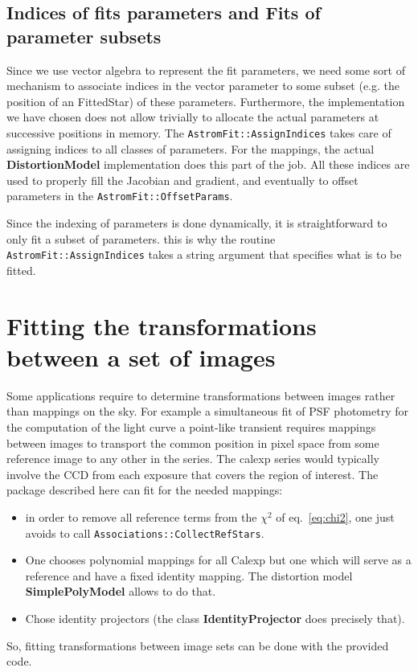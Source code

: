 \documentclass[a4paper,12pt]{scrartcl}
\newcommand{\ClName}[1]{{\bf #1}}
\newcommand{\RoutineName}[1]{\texttt{#1}}
\def\bf{\normalfont\bfseries}
\begin{document}
\subsection{Indices of fits parameters and Fits of parameter subsets \label{sec:indices_whattofit}}
Since we use vector algebra to represent the fit parameters, we need
some sort of mechanism to associate indices in the vector parameter to
some subset (e.g. the position of an FittedStar) of these parameters.
Furthermore, the implementation we have chosen does not allow
trivially to allocate the actual parameters at successive positions in
memory. The \RoutineName{AstromFit::AssignIndices} takes care of
assigning indices to all classes of parameters. For the mappings, the
actual \ClName{DistortionModel} implementation does this part of the
job. All these indices are used to properly fill the Jacobian and
gradient, and eventually to offset parameters in the
\RoutineName{AstromFit::OffsetParams}.

Since the indexing of parameters is done dynamically, it is
straightforward to only fit a subset of parameters. this is why the routine
\RoutineName{AstromFit::AssignIndices} takes a string argument that specifies
what is to be fitted.

\section{Fitting the transformations between a set of images}
Some applications require to determine transformations between images
rather than mappings on the sky. For example a simultaneous fit of PSF
photometry for the computation of the light curve a point-like
transient requires mappings between images to transport the common
position in pixel space from some reference image to any other
in the series. The calexp series would typically involve
the CCD from each exposure that covers the region of interest.
The package described here can fit for the needed mappings:
\begin{itemize}
\item in order to remove all reference terms from the $\chi^2$ of eq.~\ref{eq:chi2},
one just avoids to call \RoutineName{Associations::CollectRefStars}.
\item One chooses polynomial mappings for all Calexp 
  but one which will serve as a reference and have a fixed identity mapping.
The distortion model \ClName{SimplePolyModel} allows to do that.
\item Chose identity projectors (the class \ClName{IdentityProjector} does precisely that).
\end{itemize}
So, fitting transformations between image sets can be done with
the provided code. 
\end{document}
